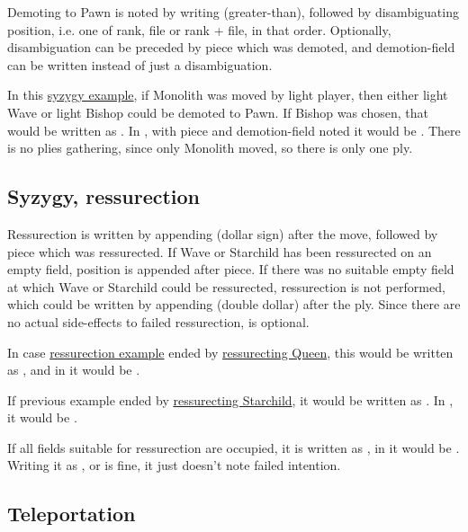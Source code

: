 Demoting to Pawn is noted by writing \alg{>} (greater-than), followed by disambiguating position, i.e.
one of rank, file or rank + file, in that order. Optionally, disambiguation can be preceded by piece which
was demoted, and demotion-field can be written instead of just a disambiguation.

In this \hyperref[fig:scn_d_15_syzygy_2_stars_init]{syzygy example}, if Monolith was moved by light player,
then either light Wave or light Bishop could be demoted to Pawn. If Bishop was chosen, that would be written
as . In , with piece and demotion-field noted it would be . There
is no plies gathering, since only Monolith moved, so there is only one ply.

\subsection*{Syzygy, ressurection}
\label{sec:Appendix/Notation/Syzygy, ressurection}

Ressurection is written by appending \alg{\$} (dollar sign) after the move, followed by piece which was
ressurected. If Wave or Starchild has been ressurected on an empty field, position is appended after piece.
If there was no suitable empty field at which Wave or Starchild could be ressurected, ressurection is not
performed, which could be written by appending \alg{\$\$} (double dollar) after the ply. Since there are
no actual side-effects to failed ressurection, \alg{\$\$} is optional.

In case \hyperref[fig:scn_o_25_syzygy_starchild_init]{ressurection example} ended by
\hyperref[fig:scn_o_26_syzygy_starchild_end]{ressurecting Queen}, this would be written as ,
and in  it would be .

If previous example ended by \hyperref[fig:scn_o_27_syzygy_starchild_ressurection]{ressurecting Starchild},
it would be written as . In , it would be .

If all fields suitable for ressurection are occupied, it is written as , in  it
would be . Writing it as , or  is fine, it just doesn't note failed
intention.

\subsection*{Teleportation}
\label{sec:Appendix/Notation/Teleportation}

